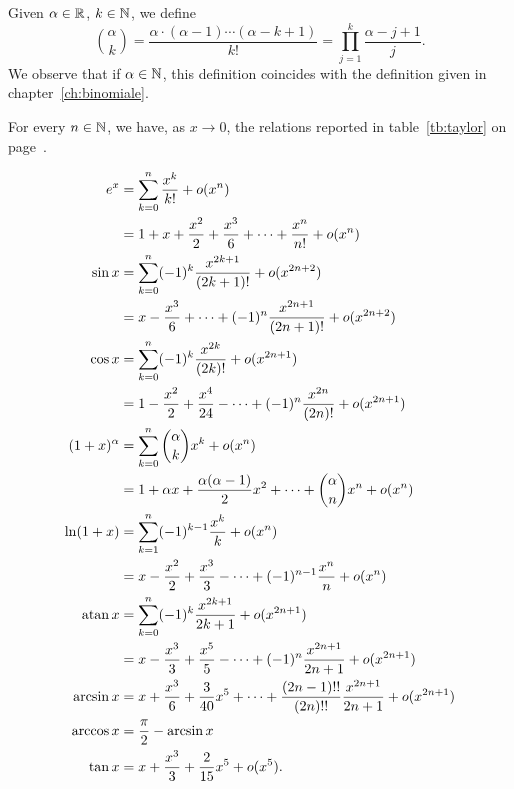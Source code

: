 \begin{definition}
\label{def:binomiale_reale}%
\mymark{***}%
Given $\alpha \in {\mathbb R}$, $k \in {\mathbb N}$, we define
\[
 {\alpha \choose k } 
 = \frac{\alpha \cdot (\alpha-1) \cdots (\alpha -k +1)}{k!}
 = \prod_{j=1}^k \frac{\alpha-j+1}{j}.
\]
We observe that if $\alpha \in {\mathbb N}$, this definition coincides
with the definition given in chapter~\ref{ch:binomiale}.
\end{definition}

\begin{theorem}
\label{th:sviluppi_taylor}%
\mymark{***}%
For every $n\in {\mathbb N}$, we have, as $x\to 0$,
the relations reported in table~\ref{tb:taylor}
on page~\pageref{tb:taylor}.
\end{theorem}
\begin{table}
\begin{align*}
e^x &= \sum_{k=0}^n \frac{x^k}{k!} + o(x^n) \\
  &= 1 + x + \frac{x^2}{2} + \frac {x^3}{6} + \dots + \frac{x^n}{n!} + o(x^n) \\
\sin x &= \sum_{k=0}^n (-1)^k\frac{x^{2k+1}}{(2k+1)!} + o(x^{2n+2}) \\
  &= x - \frac{x^3}{6} + \dots + (-1)^{n} \frac{x^{2n+1}}{(2n+1)!}  +
 o(x^{2n+2})\\
 \cos x &= \sum_{k=0}^n (-1)^k \frac{x^{2k}}{(2k)!} + o(x^{2n+1}) \\
      &= 1 - \frac{x^2}{2} + \frac{x^4}{24} - \dots + (-1)^n\frac{x^{2n}}{(2n)!}
   + o(x^{2n+1})\\
 (1+x)^\alpha &= \sum_{k=0}^n {\alpha \choose k} x^k + o(x^n)\\
        &= 1 + \alpha x + \frac{\alpha (\alpha-1)}{2} x^2 + \dots + {\alpha
    \choose n} x^n + o(x^n) \\
  \ln (1+x) &= \sum_{k=1}^n (-1)^{k-1} \frac{x^k}{k} + o(x^n) \\
                  &= x - \frac{x^2}{2} + \frac{x^3}{3} - \dots +
         (-1)^{n-1}\frac{x^n}{n} + o(x^n) \\
  \operatorname{atan} x &= \sum_{k=0}^n (-1)^k \frac{x^{2k+1}}{2k+1} + o(x^{2n+1})\\
        &= x - \frac{x^3}{3} + \frac{x^5}{5} - \dots + (-1)^n \frac{x^{2n+1}}{2n
    +1} + o(x^{2n+1})\\
  \arcsin x &= x + \frac{x^3}{6} + \frac{3}{40} x^5 + \dots + \frac{(2n-1)!!}{(2n)!!} \frac{x^{2n+1}}{2n+1} + o(x^{2n+1}) \\
  \arccos x &= \frac \pi 2 - \arcsin x\\
  \operatorname{tan} x &= x + \frac{x^3}{3} + \frac{2}{15} x^5 + o(x^5).
\end{align*}
\caption{Taylor expansions, as $x\to 0$, of some elementary functions.
%
%
See theorem~\ref{th:sviluppi_taylor}.}
\label{tb:taylor}%
\end{table}
